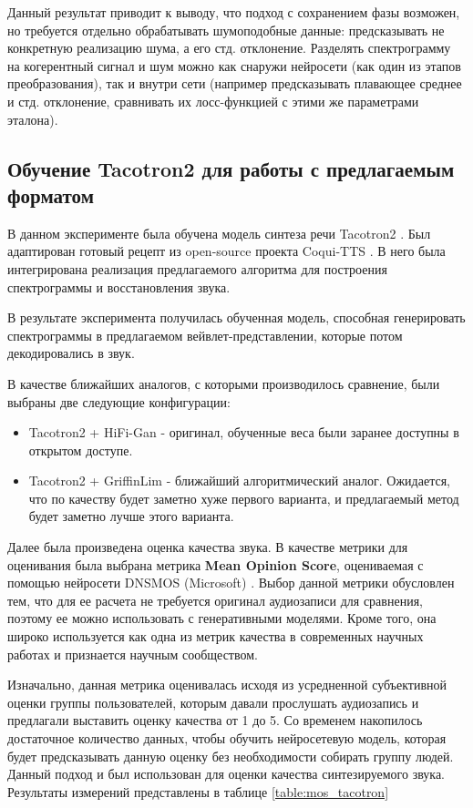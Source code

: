 Данный результат приводит к выводу, что подход с сохранением фазы возможен, но требуется отдельно обрабатывать шумоподобные данные: 
предсказывать не конкретную реализацию шума, а его стд. отклонение. Разделять спектрограмму на когерентный сигнал и шум можно как 
снаружи нейросети (как один из этапов преобразования), так и внутри сети 
(например предсказывать плавающее среднее и стд. отклонение, сравнивать их лосс-функцией с этими же параметрами эталона).


\subsection{Обучение Tacotron2 для работы с предлагаемым форматом}

В данном эксперименте была обучена модель синтеза речи Tacotron2 \cite{Tacotron2}. 
Был адаптирован готовый рецепт из open-source проекта Coqui-TTS \cite{coquiTTS}. 
В него была интегрирована реализация предлагаемого алгоритма для построения спектрограммы и восстановления звука.

В результате эксперимента получилась обученная модель, способная генерировать спектрограммы в предлагаемом вейвлет-представлении, 
которые потом декодировались в звук.

В качестве ближайших аналогов, с которыми производилось сравнение, были выбраны две следующие конфигурации:
\begin{itemize}
  \item Tacotron2 + HiFi-Gan - оригинал, обученные веса были заранее доступны в открытом доступе.
  \item Tacotron2 + GriffinLim - ближайший алгоритмический аналог. Ожидается, что по качеству будет заметно хуже первого варианта, и предлагаемый метод будет заметно лучше этого варианта.
\end{itemize}

Далее была произведена оценка качества звука. В качестве метрики для оценивания была выбрана метрика \textbf{Mean Opinion Score}, 
оцениваемая с помощью нейросети DNSMOS (Microsoft) \cite{dnsmos}. 
Выбор данной метрики обусловлен тем, что для ее расчета не требуется оригинал аудиозаписи для сравнения, поэтому ее можно использовать с 
генеративными моделями. Кроме того, она широко используется как одна из метрик качества в современных научных работах и признается научным сообществом.

Изначально, данная метрика оценивалась исходя из усредненной субъективной оценки группы пользователей, 
которым давали прослушать аудиозапись и предлагали выставить оценку качества от 1 до 5. 
Со временем накопилось достаточное количество данных, чтобы обучить нейросетевую модель, 
которая будет предсказывать данную оценку без необходимости собирать группу людей. Данный подход и был использован для оценки качества синтезируемого звука.
Результаты измерений представлены в таблице \ref{table:mos_tacotron}


